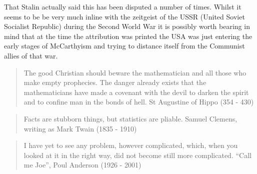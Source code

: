 \begin{aside}That Stalin actually said this has been disputed a number of times.  Whilst it seems to be be very much inline with the zeitgeist of the USSR (United Soviet Socialist Republic) during the Second World War it is possibly worth bearing in mind that at the time the attribution was printed the USA was just entering the early stages of McCarthyism and trying to distance itself from the Communist allies of that war.\end{aside}
\cenoptionrule{}
\begin{quote}
    The good Christian should beware the mathematician and all those who make empty prophecies. The danger already exists that the mathematicians have made a covenant with the devil to darken the spirit and to confine man in the bonds of hell. \textemdash St Augustine of Hippo (354 - 430) 
\end{quote}

\cenoptionrule{}

\begin{quote}
    Facts are stubborn things, but statistics are pliable. \textemdash Samuel Clemens, writing as Mark Twain (1835 - 1910) 
\end{quote}

\cenoptionrule{}

\begin{quote} \label{qt:AndersonsLaw}
    I have yet to see any problem, however complicated, which, when you looked at it in the right way, did not become still more complicated. \textemdash ``Call me Joe'',  Poul Anderson (1926 - 2001)
\end{quote}



\optionrule{}









